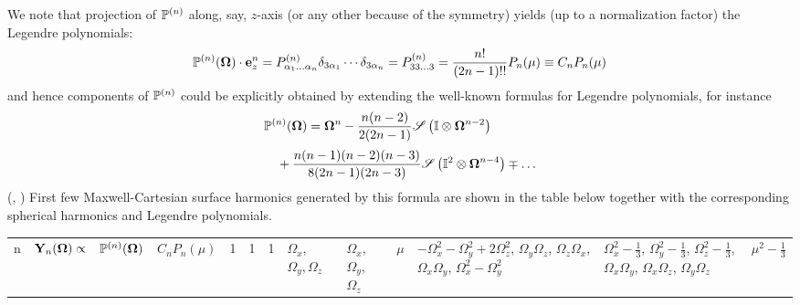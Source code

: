 We note that projection of $\mathbb{P}^{(n)}$ along, say, $z$-axis (or any other because of the symmetry) yields (up to a
normalization factor) the Legendre polynomials:
\begin{equation}\label{eq:leg}
  \mathbb{P}^{(n)}(\mathbf{\Omega})\cdot\mathbf{e}_z^n = P^{(n)}_{\alpha_1\ldots\alpha_n}\delta_{3\alpha_1}\cdots\delta_{3\alpha_n} = P^{(n)}_{33\ldots3} = \frac{n!}{(2n-1)!!}P_n(\mu) \equiv C_n P_n(\mu)
\end{equation}
and hence components of $\mathbb{P}^{(n)}$ could be explicitly obtained by extending the well-known formulas for Legendre 
polynomials, for instance
\begin{equation}\label{eq:conn1}
\begin{multlined}
  \PP(\bomega) = \bomega^n - \frac{n(n-2)}{2(2n-1)}\Sym{\eye\otimes\bomega^{n-2}}\\[.2em] +
  \frac{n(n-1)(n-2)(n-3)}{8(2n-1)(2n-3)}\Sym{\eye^2\otimes\bomega^{n-4}}\mp\ldots
  \end{multlined}
\end{equation}
(\cite[Chap. VI]{Byerly}, \cite{Johnston1})
First few Maxwell-Cartesian surface harmonics generated by this formula are shown in the table below together with the 
corresponding spherical harmonics and Legendre polynomials.
\begin{center}
	\begin{tabular}{|A|B|C|D|}
	  \hline
		n & $\mathbf{Y}_{n}(\mathbf{\Omega})\propto$ & $\mathbb{P}^{(n)}(\mathbf{\Omega})$ & $C_n P_n(\mu)$  & 1 & 1 & 1 & $\Omega_x$, $\Omega_y, \Omega_z$ & $\Omega_x$, $\Omega_y$, $\Omega_z$ & $\mu$  & $-\Omega_x^2-\Omega_y^2 + 2\Omega_z^2$, 
		    $\Omega_y\Omega_z$, 
		    $\Omega_z\Omega_x$,
		    $\Omega_x\Omega_y$,
		    $\Omega_x^2 - \Omega_y^2$ & $\Omega_x^2-\tfrac13$, 
		                                $\Omega_y^2-\tfrac13$, 
		                                $\Omega_z^2-\tfrac13$, 
		                                $\Omega_x\Omega_y$, 
		                                $\Omega_x\Omega_z$, 
		                                $\Omega_y\Omega_z$ & $\mu^2 - \tfrac13$ \nl
	\end{tabular}
	\label{tab:harmonics}
\end{center}
